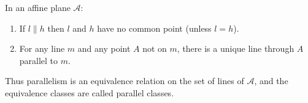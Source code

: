 In an affine plane $\mathcal{A}$:
\begin{enumerate}
\item If $l \parallel h$ then $l$ and $h$ have no common point (unless $l = h$).
\item For any line $m$ and any point $A$ not on $m$, there is a unique line through $A$ parallel to $m$.
\end{enumerate}
Thus parallelism is an equivalence relation on the set of lines of $\mathcal{A}$, and the equivalence classes are called parallel classes.
